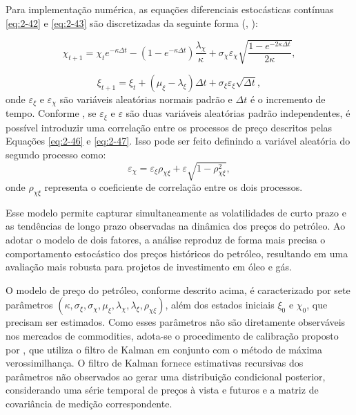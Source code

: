 Para implementação numérica, as equações diferenciais estocásticas contínuas \eqref{eq:2-42} e \eqref{eq:2-43} são discretizadas da seguinte forma (\cite{21}, \cite{22}):

\begin{equation}
\chi_{t+1} = \chi_t e^{-\kappa \Delta t} - (1 - e^{-\kappa \Delta t}) \frac{\lambda_\chi}{\kappa} + 
\sigma_\chi \varepsilon_\chi \sqrt{\frac{1 - e^{-2\kappa \Delta t}}{2\kappa}},
\label{eq:2-46}
\end{equation}

\begin{equation}
\xi_{t+1} = \xi_t + (\mu_\xi - \lambda_\xi)\Delta t + \sigma_\xi \varepsilon_\xi \sqrt{\Delta t},
\label{eq:2-47}
\end{equation}
onde $\varepsilon_\xi$ e $\varepsilon_\chi$ são variáveis aleatórias normais padrão e $\Delta t$ é o incremento de tempo. Conforme \cite{23}, se $\varepsilon_{\xi}$ e $\varepsilon$ são duas variáveis aleatórias padrão independentes, é possível introduzir uma correlação entre os processos de preço descritos pelas Equações \eqref{eq:2-46} e \eqref{eq:2-47}. Isso pode ser feito definindo a variável aleatória do segundo processo como:
\begin{equation}
\varepsilon_\chi = \varepsilon_\xi \rho_{\chi\xi} + \varepsilon \sqrt{1 - \rho_{\chi\xi}^2},
\label{eq:2-48}
\end{equation}
onde $\rho_{\chi\xi}$ representa o coeficiente de correlação entre os dois processos.

Esse modelo permite capturar simultaneamente as volatilidades de curto prazo e as tendências de longo prazo observadas na dinâmica dos preços do petróleo. Ao adotar o modelo de dois fatores, a análise reproduz de forma mais precisa o comportamento estocástico dos preços históricos do petróleo, resultando em uma avaliação mais robusta para projetos de investimento em óleo e gás.

O modelo de preço do petróleo, conforme descrito acima, é caracterizado por sete parâmetros $(\kappa, \sigma_\xi, \sigma_\chi, \mu_\xi, \lambda_\chi, \lambda_\xi, \rho_{\chi\xi})$, além dos estados iniciais $\xi_0$ e $\chi_0$, que precisam ser estimados. Como esses parâmetros não são diretamente observáveis nos mercados de commodities, adota-se o procedimento de calibração proposto por \cite{24}, que utiliza o filtro de Kalman em conjunto com o método de máxima verossimilhança. O filtro de Kalman fornece estimativas recursivas dos parâmetros não observados ao gerar uma distribuição condicional posterior, considerando uma série temporal de preços à vista e futuros e a matriz de covariância de medição correspondente.

